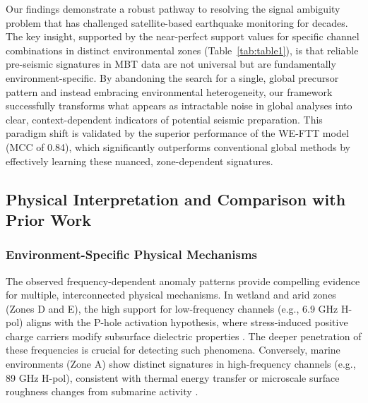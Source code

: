 \documentclass[preprint,review,12pt,authoryear]{elsarticle}
\begin{document}
Our findings demonstrate a robust pathway to resolving the signal ambiguity problem that has challenged satellite-based earthquake monitoring for decades. The key insight, supported by the near-perfect support values for specific channel combinations in distinct environmental zones (Table~\ref{tab:table1}), is that reliable pre-seismic signatures in MBT data are not universal but are fundamentally environment-specific. By abandoning the search for a single, global precursor pattern and instead embracing environmental heterogeneity, our framework successfully transforms what appears as intractable noise in global analyses into clear, context-dependent indicators of potential seismic preparation. This paradigm shift is validated by the superior performance of the WE-FTT model (MCC of 0.84), which significantly outperforms conventional global methods by effectively learning these nuanced, zone-dependent signatures.

\subsection{Physical Interpretation and Comparison with Prior Work}\label{sec:discuss_physical}

\subsubsection{Environment-Specific Physical Mechanisms}
The observed frequency-dependent anomaly patterns provide compelling evidence for multiple, interconnected physical mechanisms. In wetland and arid zones (Zones D and E), the high support for low-frequency channels (e.g., 6.9 GHz H-pol) aligns with the P-hole activation hypothesis, where stress-induced positive charge carriers modify subsurface dielectric properties \citep{freundPreearthquakeSignalsUnderlying2011}. The deeper penetration of these frequencies is crucial for detecting such phenomena. Conversely, marine environments (Zone A) show distinct signatures in high-frequency channels (e.g., 89 GHz H-pol), consistent with thermal energy transfer or microscale surface roughness changes from submarine activity \citep{liuGeneralFeaturesMultiparameter2023}.
\end{document}
